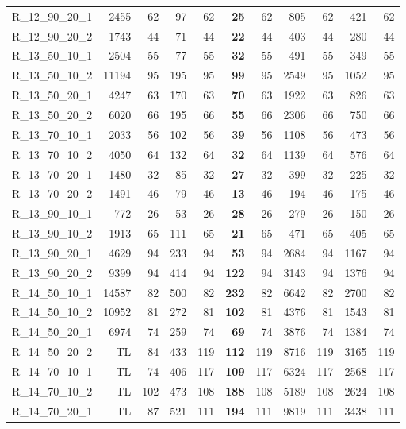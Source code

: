 \documentclass{article}
\begin{document}
\begin{longtable}{lrrrrrrrrrr}
R\_12\_90\_20\_1 & 2455 & 62 & 97 & 62 & \textbf{25} & 62 & 805 & 62 & 421 & 62 \\
R\_12\_90\_20\_2 & 1743 & 44 & 71 & 44 & \textbf{22} & 44 & 403 & 44 & 280 & 44 \\
R\_13\_50\_10\_1 & 2504 & 55 & 77 & 55 & \textbf{32} & 55 & 491 & 55 & 349 & 55 \\
R\_13\_50\_10\_2 & 11194 & 95 & 195 & 95 & \textbf{99} & 95 & 2549 & 95 & 1052 & 95 \\
R\_13\_50\_20\_1 & 4247 & 63 & 170 & 63 & \textbf{70} & 63 & 1922 & 63 & 826 & 63 \\
R\_13\_50\_20\_2 & 6020 & 66 & 195 & 66 & \textbf{55} & 66 & 2306 & 66 & 750 & 66 \\
R\_13\_70\_10\_1 & 2033 & 56 & 102 & 56 & \textbf{39} & 56 & 1108 & 56 & 473 & 56 \\
R\_13\_70\_10\_2 & 4050 & 64 & 132 & 64 & \textbf{32} & 64 & 1139 & 64 & 576 & 64 \\
R\_13\_70\_20\_1 & 1480 & 32 & 85 & 32 & \textbf{27} & 32 & 399 & 32 & 225 & 32 \\
R\_13\_70\_20\_2 & 1491 & 46 & 79 & 46 & \textbf{13} & 46 & 194 & 46 & 175 & 46 \\
R\_13\_90\_10\_1 & 772 & 26 & 53 & 26 & \textbf{28} & 26 & 279 & 26 & 150 & 26 \\
R\_13\_90\_10\_2 & 1913 & 65 & 111 & 65 & \textbf{21} & 65 & 471 & 65 & 405 & 65 \\
R\_13\_90\_20\_1 & 4629 & 94 & 233 & 94 & \textbf{53} & 94 & 2684 & 94 & 1167 & 94 \\
R\_13\_90\_20\_2 & 9399 & 94 & 414 & 94 & \textbf{122} & 94 & 3143 & 94 & 1376 & 94 \\
R\_14\_50\_10\_1 & 14587 & 82 & 500 & 82 & \textbf{232} & 82 & 6642 & 82 & 2700 & 82 \\
R\_14\_50\_10\_2 & 10952 & 81 & 272 & 81 & \textbf{102} & 81 & 4376 & 81 & 1543 & 81 \\
R\_14\_50\_20\_1 & 6974 & 74 & 259 & 74 & \textbf{69} & 74 & 3876 & 74 & 1384 & 74 \\
R\_14\_50\_20\_2 & TL & 84 & 433 & 119 & \textbf{112} & 119 & 8716 & 119 & 3165 & 119 \\
R\_14\_70\_10\_1 & TL & 74 & 406 & 117 & \textbf{109} & 117 & 6324 & 117 & 2568 & 117 \\
R\_14\_70\_10\_2 & TL & 102 & 473 & 108 & \textbf{188} & 108 & 5189 & 108 & 2624 & 108 \\
R\_14\_70\_20\_1 & TL & 87 & 521 & 111 & \textbf{194} & 111 & 9819 & 111 & 3438 & 111 \\

\end{longtable}
\end{document}
